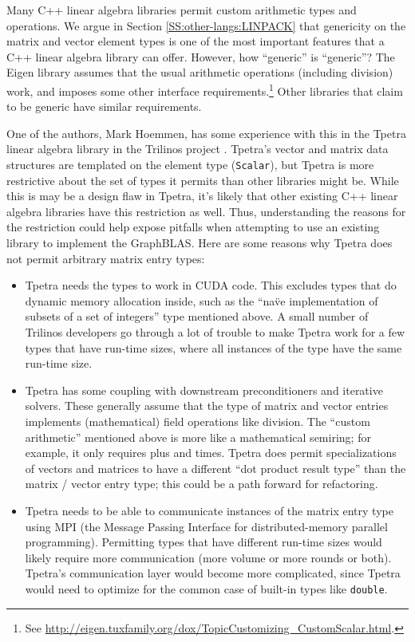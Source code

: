 Many C++ linear algebra libraries permit custom arithmetic types and
operations.  We argue in Section \ref{SS:other-langs:LINPACK} that
genericity on the matrix and vector element types is one of the most
important features that a C++ linear algebra library can offer.
However, how ``generic'' is ``generic''?  The Eigen library assumes
that the usual arithmetic operations (including division) work, and
imposes some other interface requirements.\footnote{See
  \url{http://eigen.tuxfamily.org/dox/TopicCustomizing_CustomScalar.html}.}
Other libraries that claim to be generic have similar requirements.

One of the authors, Mark Hoemmen, has some experience with this in the
Tpetra linear algebra library \cite{baker2012tpetra} in the Trilinos
project \cite{heroux2005trilinos}.  Tpetra's vector and matrix data
structures are templated on the element type (\texttt{Scalar}), but
Tpetra is more restrictive about the set of types it permits than
other libraries might be.  While this is may be a design flaw in
Tpetra, it's likely that other existing C++ linear algebra libraries
have this restriction as well.  Thus, understanding the reasons for
the restriction could help expose pitfalls when attempting to use an
existing library to implement the GraphBLAS.  Here are some reasons
why Tpetra does not permit arbitrary matrix entry types:
\begin{itemize}
\item Tpetra needs the types to work in CUDA code.  This excludes
  types that do dynamic memory allocation inside, such as the ``na\"ve
  implementation of subsets of a set of integers'' type mentioned
  above.  A small number of Trilinos developers go through a lot of
  trouble to make Tpetra work for a few types that have run-time
  sizes, where all instances of the type have the same run-time size.
\item Tpetra has some coupling with downstream preconditioners and
  iterative solvers.  These generally assume that the type of matrix
  and vector entries implements (mathematical) field operations like
  division.  The ``custom arithmetic'' mentioned above is more like a
  mathematical semiring; for example, it only requires plus and times.
  Tpetra does permit specializations of vectors and matrices to have a
  different ``dot product result type'' than the matrix / vector entry
  type; this could be a path forward for refactoring.
\item Tpetra needs to be able to communicate instances of the matrix
  entry type using MPI (the Message Passing Interface for
  distributed-memory parallel programming).  Permitting types that
  have different run-time sizes would likely require more
  communication (more volume or more rounds or both).  Tpetra's
  communication layer would become more complicated, since Tpetra
  would need to optimize for the common case of built-in types like
  \texttt{double}.
\end{itemize}

